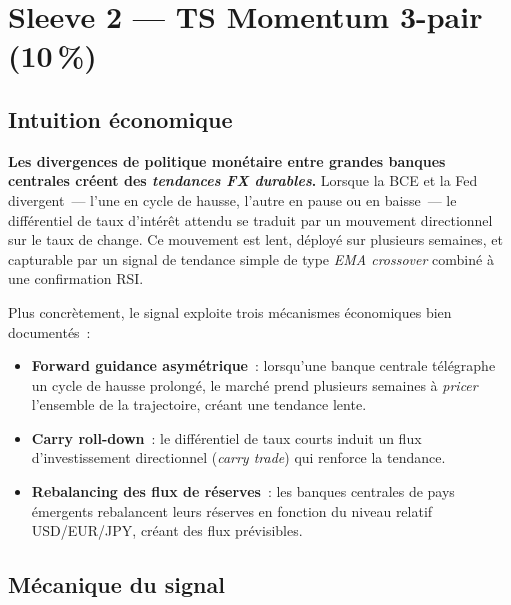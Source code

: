 \section{Sleeve 2 --- TS Momentum 3-pair (10\,\%)}
\label{sec:ts_momentum}

\subsection{Intuition économique}

\begin{thesisbox}
\textbf{Les divergences de politique monétaire entre grandes banques centrales créent des \emph{tendances FX durables}.} Lorsque la BCE et la Fed divergent~--- l'une en cycle de hausse, l'autre en pause ou en baisse~--- le différentiel de taux d'intérêt attendu se traduit par un mouvement directionnel sur le taux de change. Ce mouvement est lent, déployé sur plusieurs semaines, et capturable par un signal de tendance simple de type \emph{EMA crossover} combiné à une confirmation RSI.
\end{thesisbox}

Plus concrètement, le signal exploite trois mécanismes économiques bien documentés~:
\begin{itemize}
\item \textbf{Forward guidance asymétrique}~: lorsqu'une banque centrale télégraphe un cycle de hausse prolongé, le marché prend plusieurs semaines à \emph{pricer} l'ensemble de la trajectoire, créant une tendance lente.
\item \textbf{Carry roll-down}~: le différentiel de taux courts induit un flux d'investissement directionnel (\emph{carry trade}) qui renforce la tendance.
\item \textbf{Rebalancing des flux de réserves}~: les banques centrales de pays émergents rebalancent leurs réserves en fonction du niveau relatif USD/EUR/JPY, créant des flux prévisibles.
\end{itemize}

\subsection{Mécanique du signal}

